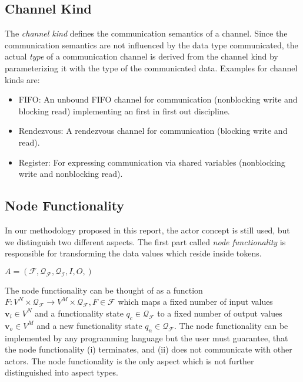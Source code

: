 \subsection{Channel Kind}\label{channel-kind}

The \emph{channel kind} defines the communication semantics of a channel.
Since the communication semantics are not influenced by the
data type communicated, the actual \emph{type} of a communication
channel is derived from the channel kind by parameterizing it with
the type of the communicated data. Examples for channel kinds are:

\begin{itemize}
\item \label{channel-kind-fifo} FIFO:
  An unbound FIFO channel for communication
  (nonblocking write and blocking read) implementing
  an first in first out discipline.

\item \label{channel-kind-rendezvous} Rendezvous:
  A rendezvous channel for communication %
  (blocking write and read).

\item \label{channel-kind-register} Register:
  For expressing communication via shared variables
  (nonblocking write and nonblocking read).
\end{itemize}

\subsection{Node Functionality}\label{node-functionality}

In our methodology proposed in this report, the actor concept is still used,
but we distinguish two different aspects.
The first part called \emph{node functionality} is responsible
for transforming the data values which reside inside tokens.

$A=(\mathcal{F},\mathcal{Q_F},\mathcal{Q_I},I,O,)$

The node functionality can be
thought of as a function
$F: V^N \times \mathcal{Q_F} \to V^M \times \mathcal{Q_F}, F \in \mathcal{F}$
which maps a fixed number of input values $\mathbf{v}_i \in V^N$ and
a functionality state $q_c \in \mathcal{Q_F}$ to a fixed number of output values
$\mathbf{v}_o \in V^M$ and a new functionality state $q_n \in \mathcal{Q_F}$.
The node functionality can be implemented by any programming language but
the user must guarantee, that the node functionality (i) terminates,
and (ii) does not communicate with other actors.
The node functionality is the only aspect which is not
further distinguished into aspect types.

